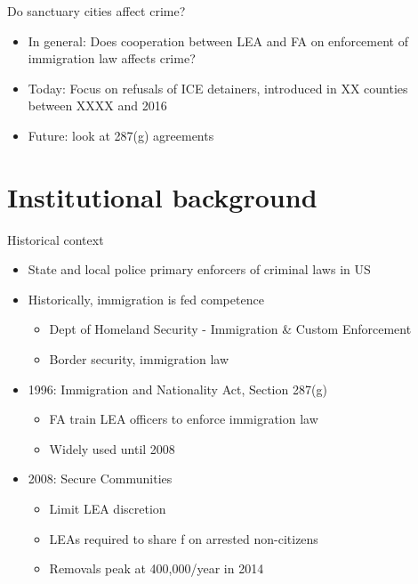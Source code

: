 \documentclass[xcolor=pdftex,dvipsnames,table]{beamer}
\begin{document}
\begin{frame}{ Do sanctuary cities affect crime?}
\begin{itemize}
\item In general: Does cooperation between LEA and FA on enforcement of immigration law affects crime?
\item Today: Focus on refusals of ICE detainers, introduced in XX counties between XXXX and 2016
\item Future: look at 287(g) agreements
\end{itemize}
\end{frame}

\section{Institutional background}

\begin{frame}{Historical context}
\begin{itemize}
\item State and local police primary enforcers of criminal laws in US
\item Historically, immigration is fed competence
\begin{itemize}
\item Dept of Homeland Security - Immigration \& Custom Enforcement
\item Border security, immigration law
\end{itemize}
\item 1996: Immigration and Nationality Act, Section 287(g)
\begin{itemize}
\item FA train LEA officers to enforce immigration law
\item Widely used until 2008
\end{itemize}
\item 2008: Secure Communities
\begin{itemize}
\item Limit LEA discretion
\item LEAs required to share f on arrested non-citizens
\item Removals peak at 400,000/year in 2014
\end{itemize}
\end{itemize}
\end{frame}
\end{document}

